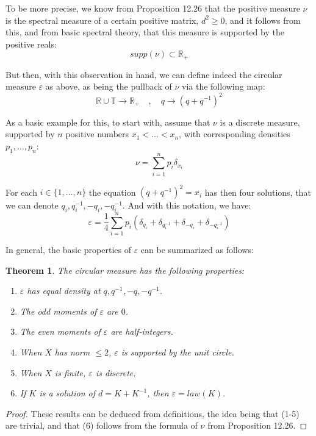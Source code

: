 \documentclass[12pt]{amsbook}
\newtheorem{theorem}{Theorem}[chapter]
\begin{document}
To be more precise, we know from Proposition 12.26 that the positive measure $\nu$ is the spectral measure of a certain positive matrix, $d^2\geq0$, and it follows from this, and from basic spectral theory, that this measure is supported by the positive reals:
$$supp(\nu)\subset\mathbb R_+$$

But then, with this observation in hand, we can define indeed the circular measure $\varepsilon$ as above, as being the pullback of $\nu$ via the following map:
$$\mathbb R\cup\mathbb T\to\mathbb R_+\quad,\quad 
q\to (q+q^{-1})^2$$

As a basic example for this, to start with, assume that $\nu$ is a discrete measure, supported by $n$ positive numbers $x_1<\ldots<x_n$, with corresponding densities $p_1,\ldots,p_n$:
$$\nu=\sum_{i=1}^n p_i\delta_{x_i}$$

For each $i\in\{1,\ldots,n\}$ the equation $(q+q^{-1})^2=x_i$ has then four solutions, that we can denote $q_i,q_i^{-1},-q_i,-q_i^{-1}$. And with this notation, we have:
$$\varepsilon=\frac{1}{4}\sum_{i=1}^np_i\left(\delta_{q_i}+\delta_{q_i^{-1}}+\delta_{-q_i}+\delta_{-q_i^{-1}}\right)$$

In general, the basic properties of $\varepsilon$ can be summarized as follows:

\begin{theorem}
The circular measure has the following properties:
\begin{enumerate}
\item $\varepsilon$ has equal density at $q,q^{-1},-q,-q^{-1}$.

\item The odd moments of $\varepsilon$ are $0$.

\item The even moments of $\varepsilon$ are half-integers.

\item When $X$ has norm $\leq 2$, $\varepsilon$ is supported by the unit circle.

\item When $X$ is finite, $\varepsilon$ is discrete.

\item If $K$ is a solution of $d=K+K^{-1}$, then $\varepsilon=law(K)$. 
\end{enumerate}
\end{theorem}

\begin{proof}
These results can be deduced from definitions, the idea being that (1-5) are trivial, and that (6) follows from the formula of $\nu$ from Proposition 12.26.
\end{proof}
\end{document}
